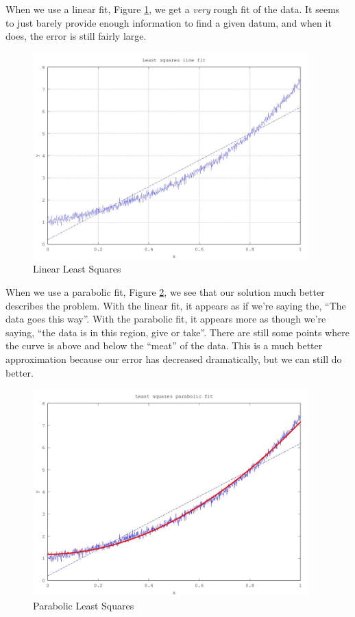\documentclass[12pt,letterpaper]{article}
\begin{document}
  When we use a linear fit, Figure \ref{fig:linear_least_squares}, we get a \textit{very} rough fit of the data. It seems to just barely provide enough information to find a given datum, and when it does, the error is still fairly large.

  \begin{figure}[h]
    \centering
    \includegraphics[width=0.95\textwidth]{least_squares_linear.jpg}
    \caption{Linear Least Squares}
    \label{fig:linear_least_squares}
  \end{figure}

  \pagebreak

  When we use a parabolic fit, Figure \ref{fig:parabolic_least_squares}, we see that our solution much better describes the problem.
  With the linear fit, it appears as if we're saying the, ``The data goes this way''.
  With the parabolic fit, it appears more as though we're saying, ``the data is in this region, give or take''. There are still some points where the curve is above and below the ``meat'' of the data. This is a much better approximation because our error has decreased dramatically, but we can still do better.

  \begin{figure}[h]
    \centering
    \includegraphics[width=0.95\textwidth]{least_squares_parabolic.jpg}
    \caption{Parabolic Least Squares}
    \label{fig:parabolic_least_squares}
  \end{figure}
\end{document}
